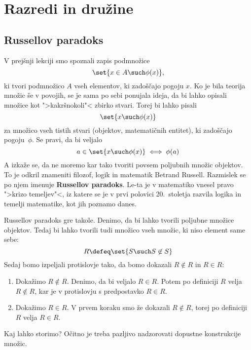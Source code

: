 \chapter{Razredi in družine}

\section{Russellov paradoks}

V prejšnji lekciji smo spoznali zapis podmnožice
%
\begin{equation*}
    \set{ x \in A \such \phi(x) },
\end{equation*}
%
ki tvori podmnožico $A$ vseh elementov, ki zadoščajo pogoju $x$. Ko je bila
teorija množic še v povojih, se je sama po sebi ponujala ideja, da bi lahko
opisali množice kot ">kakršnokoli"< zbirko stvari. Torej bi lahko pisali
%
\begin{equation*}
    \set{ x \such \phi(x) }
\end{equation*}
%
za množico vseh tistih stvari (objektov, matematičnih entitet), ki zadoščajo
pogoju~$\phi$. Se pravi, da bi veljalo
%
\begin{equation*}
    a \in \set{ x \such \phi(x) } \iff \phi(a)
\end{equation*}
%
A izkaže se, da ne moremo kar tako tvoriti povsem poljubnih množic objektov. To
je odkril znameniti filozof, logik in matematik Betrand Russell. Razmislek se po
njem imenuje \textbf{Russellov paradoks}. Le-ta je v matematiko vnesel pravo ">krizo
temeljev"<, iz katere se je v prvi polovici 20.~stoletja razvila logika in
temelji matematike, kot jih poznamo danes.

Russellov paradoks gre takole. Denimo, da bi lahko tvorili poljubne množice
objektov. Tedaj bi lahko tvorili tudi množico vseh množic, ki niso element same
sebe:
%
\begin{equation*}
    R \defeq \set{ S \such S \not\in S }
\end{equation*}
%
Sedaj bomo izpeljali protislovje tako, da bomo dokazali $R \not\in R$ in $R \in R$:
%
\begin{enumerate}
\item Dokažimo $R \not\in R$.
  Denimo, da bi veljalo $R \in R$. Potem po definiciji $R$ velja $R \not\in R$, kar
  je v protislovju s predpostavko $R \in R$.

\item
  Dokažimo $R \in R$. V prvem koraku smo že dokazali $R \not\in R$, torej po
  definiciji $R$ velja $R \in R$.
\end{enumerate}
%
Kaj lahko storimo? Očitno je treba pazljivo nadzorovati dopustne konstrukcije
množic.

